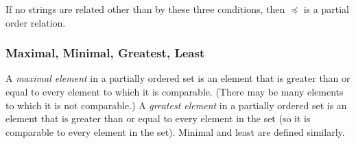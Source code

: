 \documentclass[12pt]{article}
\begin{document}
If no strings are related other than by these three conditions, then $\preceq$ is a partial order relation.


\subsubsection*{Maximal, Minimal, Greatest, Least}
A \textit{maximal element} in a partially ordered set is an element that is greater than or equal to every element to which it is comparable. (There may be many elements to which it is not comparable.) A \textit{greatest element} in a partially ordered set is an element that is greater than or equal to every element in the set (so it is comparable to every element in the set). Minimal and least are defined similarly.
\end{document}
